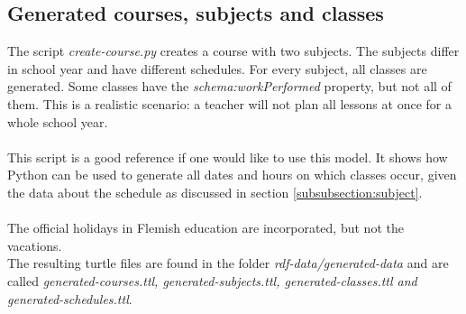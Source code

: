 \documentclass[a4paper]{report}
\begin{document}
    \subsection{Generated courses, subjects and classes}
    The script \emph{create-course.py} creates a course with two subjects. The subjects differ in school year and have different schedules.
    For every subject, all classes are generated. Some classes have the \emph{schema:workPerformed} property, but not all of them.
    This is a realistic scenario: a teacher will not plan all lessons at once for a whole school year.\\ \\
    This script is a good reference if one would like to use this model.
    It shows how Python can be used to generate all dates and hours on which classes occur, given the data about the schedule as discussed in section \ref{subsubsection:subject}.\\ \\
    The official holidays in Flemish education are incorporated, but not the vacations.\\
    The resulting turtle files are found in the folder \emph{rdf-data/generated-data} and are called \emph{generated-courses.ttl, generated-subjects.ttl, generated-classes.ttl and generated-schedules.ttl}.
\end{document}
